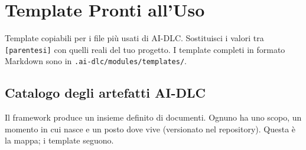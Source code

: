 ﻿%

\chapter{Template Pronti all'Uso}
\label{app:template}

Template copiabili per i file più usati di AI-DLC. Sostituisci i valori tra \texttt{[parentesi]} con quelli reali del tuo progetto. I template completi in formato Markdown sono in \texttt{.ai-dlc/modules/templates/}.

\section*{Catalogo degli artefatti AI-DLC}

Il framework produce un insieme definito di documenti. Ognuno ha uno scopo, un momento in cui nasce e un posto dove vive (versionato nel repository). Questa è la mappa; i template seguono.

